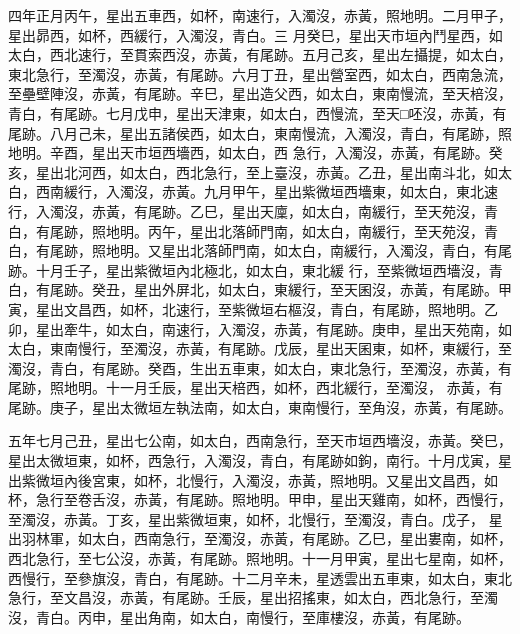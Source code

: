 \begin{pinyinscope}
 四年正月丙午，星出五車西，如杯，南速行，入濁沒，赤黃，照地明。二月甲子，星出昴西，如杯，西緩行，入濁沒，青白。三
 月癸巳，星出天市垣內鬥星西，如太白，西北速行，至貫索西沒，赤黃，有尾跡。五月己亥，星出左攝提，如太白，東北急行，至濁沒，赤黃，有尾跡。六月丁丑，星出營室西，如太白，西南急流，至壘壁陣沒，赤黃，有尾跡。辛巳，星出造父西，如太白，東南慢流，至天棓沒，青白，有尾跡。七月戊申，星出天津東，如太白，西慢流，至天□呸沒，赤黃，有尾跡。八月己未，星出五諸侯西，如太白，東南慢流，入濁沒，青白，有尾跡，照地明。辛酉，星出天市垣西墻西，如太白，西
 急行，入濁沒，赤黃，有尾跡。癸亥，星出北河西，如太白，西北急行，至上臺沒，赤黃。乙丑，星出南斗北，如太白，西南緩行，入濁沒，赤黃。九月甲午，星出紫微垣西墻東，如太白，東北速行，入濁沒，赤黃，有尾跡。乙巳，星出天廩，如太白，南緩行，至天苑沒，青白，有尾跡，照地明。丙午，星出北落師門南，如太白，南緩行，至天苑沒，青白，有尾跡，照地明。又星出北落師門南，如太白，南緩行，入濁沒，青白，有尾跡。十月壬子，星出紫微垣內北極北，如太白，東北緩
 行，至紫微垣西墻沒，青白，有尾跡。癸丑，星出外屏北，如太白，東緩行，至天囷沒，赤黃，有尾跡。甲寅，星出文昌西，如杯，北速行，至紫微垣右樞沒，青白，有尾跡，照地明。乙卯，星出牽牛，如太白，南速行，入濁沒，赤黃，有尾跡。庚申，星出天苑南，如太白，東南慢行，至濁沒，赤黃，有尾跡。戊辰，星出天囷東，如杯，東緩行，至濁沒，青白，有尾跡。癸酉，生出五車東，如太白，東北急行，至濁沒，赤黃，有尾跡，照地明。十一月壬辰，星出天棓西，如杯，西北緩行，至濁沒，
 赤黃，有尾跡。庚子，星出太微垣左執法南，如太白，東南慢行，至角沒，赤黃，有尾跡。



 五年七月己丑，星出七公南，如太白，西南急行，至天市垣西墻沒，赤黃。癸巳，星出太微垣東，如杯，西急行，入濁沒，青白，有尾跡如鉤，南行。十月戊寅，星出紫微垣內後宮東，如杯，北慢行，入濁沒，赤黃，照地明。又星出文昌西，如杯，急行至卷舌沒，赤黃，有尾跡。照地明。甲申，星出天雞南，如杯，西慢行，至濁沒，赤黃。丁亥，星出紫微垣東，如杯，北慢行，至濁沒，青白。戊子，
 星出羽林軍，如太白，西南急行，至濁沒，赤黃，有尾跡。乙巳，星出婁南，如杯，西北急行，至七公沒，赤黃，有尾跡。照地明。十一月甲寅，星出七星南，如杯，西慢行，至參旗沒，青白，有尾跡。十二月辛未，星透雲出五車東，如太白，東北急行，至文昌沒，赤黃，有尾跡。壬辰，星出招搖東，如太白，西北急行，至濁沒，青白。丙申，星出角南，如太白，南慢行，至庫樓沒，赤黃，有尾跡。




\end{pinyinscope}
